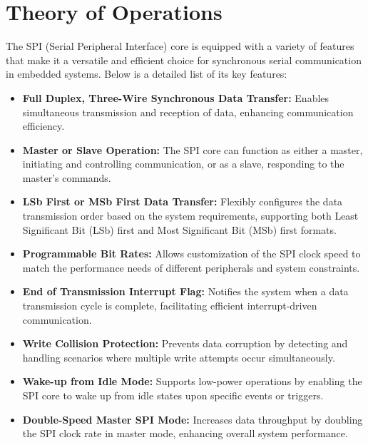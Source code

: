 \section{Theory of Operations}

The SPI (Serial Peripheral Interface) core is equipped with a variety of features that make it a versatile and efficient choice for synchronous serial communication in embedded systems. Below is a detailed list of its key features:

\begin{itemize}
    \item \textbf{Full Duplex, Three-Wire Synchronous Data Transfer:} Enables simultaneous transmission and reception of data, enhancing communication efficiency.
    \item \textbf{Master or Slave Operation:} The SPI core can function as either a master, initiating and controlling communication, or as a slave, responding to the master's commands.
    \item \textbf{LSb First or MSb First Data Transfer:} Flexibly configures the data transmission order based on the system requirements, supporting both Least Significant Bit (LSb) first and Most Significant Bit (MSb) first formats.
    \item \textbf{Programmable Bit Rates:} Allows customization of the SPI clock speed to match the performance needs of different peripherals and system constraints.
    \item \textbf{End of Transmission Interrupt Flag:} Notifies the system when a data transmission cycle is complete, facilitating efficient interrupt-driven communication.
    \item \textbf{Write Collision Protection:} Prevents data corruption by detecting and handling scenarios where multiple write attempts occur simultaneously.
    \item \textbf{Wake-up from Idle Mode:} Supports low-power operations by enabling the SPI core to wake up from idle states upon specific events or triggers.
    \item \textbf{Double-Speed Master SPI Mode:} Increases data throughput by doubling the SPI clock rate in master mode, enhancing overall system performance.
\end{itemize}

